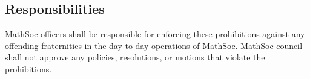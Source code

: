 \subsection{Responsibilities}
MathSoc officers shall be responsible for enforcing these prohibitions against any offending fraternities in the day to day operations of MathSoc. MathSoc council shall not approve any policies, resolutions, or motions that violate the prohibitions.

